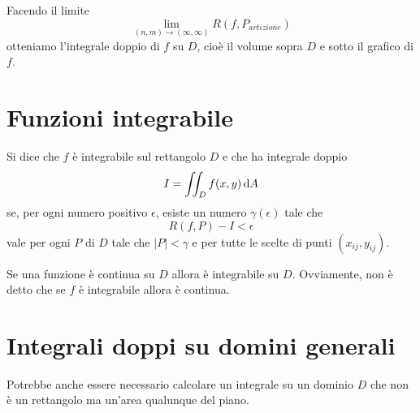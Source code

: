 Facendo il limite
$$\lim_{(n,m) \to (\infty, \infty)} R(f,P_{artizione})$$ otteniamo l'integrale doppio di $f$ su $D$, cioè il volume sopra $D$ e sotto il grafico di $f$.


\section{Funzioni integrabile}

\begin{definition}
Si dice che $f$ è integrabile sul rettangolo $D$ e che ha integrale doppio $$I = \iint_D f(x,y) \mathop{}\!\mathrm{d} A$$
se, per ogni numero positivo $\epsilon$, esiste un numero $\gamma(\epsilon)$ tale  che $$R(f,P)-I<\epsilon$$ vale per ogni $P$ di $D$ tale che $|P|<\gamma$ e per tutte le scelte di punti $(x_{ij},y_{ij})$.
\end{definition}

\begin{property}
Se una funzione è continua su $D$ allora è integrabile su $D$. Ovviamente, non è detto che se $f$ è integrabile allora è continua.
\end{property}

\section{Integrali doppi su domini generali}

Potrebbe anche essere necessario calcolare un integrale su un dominio $D$ che non è un rettangolo ma un'area qualunque del piano.
